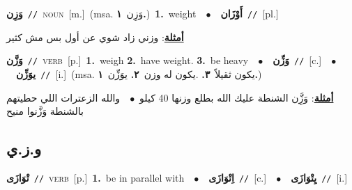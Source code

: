 \documentclass[10pt,a4paper,twoside]{article} %
\begin{document}
\begin{multicols}{2}
{\setlength\topsep{0pt}\textbf{\foreignlanguage{arabic}{وَزِن}}\ {\color{gray}\texttt{//}\color{black}}\ \textsc{noun}\ [m.]\ \color{gray}(msa. \foreignlanguage{arabic}{وَزِن}~\foreignlanguage{arabic}{\textbf{١.}})\color{black}\ \textbf{1.}~weight\ \ $\bullet$\ \ \setlength\topsep{0pt}\textbf{\foreignlanguage{arabic}{أَوْزَان}}\ {\color{gray}\texttt{//}\color{black}}\ [pl.]\  \begin{flushright}\color{gray}\foreignlanguage{arabic}{\textbf{\underline{\foreignlanguage{arabic}{أمثلة}}}: وزني زاد شوي عن أول بس مش كثير}\end{flushright}\color{black}} \vspace{2mm}

{\setlength\topsep{0pt}\textbf{\foreignlanguage{arabic}{وَزَّن}}\ {\color{gray}\texttt{//}\color{black}}\ \textsc{verb}\ [p.]\ \textbf{1.}~weigh  \textbf{2.}~have weight.  \textbf{3.}~be heavy\ \ $\bullet$\ \ \setlength\topsep{0pt}\textbf{\foreignlanguage{arabic}{وَزِّن}}\ {\color{gray}\texttt{//}\color{black}}\ [c.]\ \ $\bullet$\ \ \setlength\topsep{0pt}\textbf{\foreignlanguage{arabic}{يوَزِّن}}\ {\color{gray}\texttt{//}\color{black}}\ [i.]\ \color{gray}(msa. \foreignlanguage{arabic}{يكون ثقيلاً}~\foreignlanguage{arabic}{\textbf{٣.}}  .\foreignlanguage{arabic}{يكون له وزن}~\foreignlanguage{arabic}{\textbf{٢.}}  \foreignlanguage{arabic}{يوَزِّن}~\foreignlanguage{arabic}{\textbf{١.}})\color{black}\  \begin{flushright}\color{gray}\foreignlanguage{arabic}{\textbf{\underline{\foreignlanguage{arabic}{أمثلة}}}: وَزَِّن الشنطة عليك الله بطلع وزنها 40 كيلو\ $\bullet$\ \  والله الزعترات اللي حطيتهم بالشنطة وَزَّنوا منيح}\end{flushright}\color{black}} \vspace{2mm}

\vspace{-3mm}
\subsection*{\color{blue}\foreignlanguage{arabic}{و.ز.ي}\color{blue}{}} 

{\setlength\topsep{0pt}\textbf{\foreignlanguage{arabic}{تْوَازَى}}\ {\color{gray}\texttt{//}\color{black}}\ \textsc{verb}\ [p.]\ \textbf{1.}~be in parallel with\ \ $\bullet$\ \ \setlength\topsep{0pt}\textbf{\foreignlanguage{arabic}{اِتْوَازَى}}\ {\color{gray}\texttt{//}\color{black}}\ [c.]\ \ $\bullet$\ \ \setlength\topsep{0pt}\textbf{\foreignlanguage{arabic}{يِتْوَازَى}}\ {\color{gray}\texttt{//}\color{black}}\ [i.]\ } \vspace{2mm}


\end{multicols}
\end{document}
